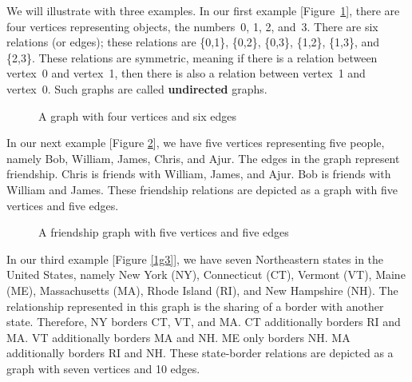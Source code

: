 We will illustrate with three examples. In our first example [Figure~\ref{1g1}], there are four vertices representing objects, the numbers~0, 1, 2, and~3. There are six relations (or edges); these relations are \{0,1\}, \{0,2\}, \{0,3\}, \{1,2\}, \{1,3\}, and \{2,3\}. These relations are symmetric, meaning if there is a relation between vertex~0 and vertex~1, then there is also a relation between vertex~1 and vertex~0. Such graphs are called \textbf{undirected}  graphs.
\begin{figure}
\begin{center}
\caption{A graph with four vertices and six edges}\label{1g1}
\end{center}
\end{figure}
\begin{newpage}
\end{newpage}

In our next example [Figure \ref{1g2}], we have five vertices representing five people, namely Bob, William, James, Chris, and Ajur. The edges in the graph represent friendship. Chris is friends with William, James, and Ajur. Bob is friends with William and James. These friendship relations are depicted as a graph with five vertices and five edges.
\begin{figure}
\begin{center}
\caption{A friendship graph with five vertices and five edges}\label{1g2}
\end{center}
\end{figure}


\begin{newpage}
\end{newpage}
In our third example [Figure \ref{1g3}], we have seven Northeastern states in the United States, namely New York (NY), Connecticut (CT), Vermont (VT), Maine (ME), Massachusetts (MA), Rhode Island (RI), and New Hampshire (NH). The relationship represented in this graph is the sharing of a border with another state. Therefore, NY borders CT, VT, and MA. CT additionally borders RI and MA. VT additionally borders MA and NH. ME only borders NH. MA additionally borders RI and NH. These state-border relations are depicted as a graph with seven vertices and 10 edges.

